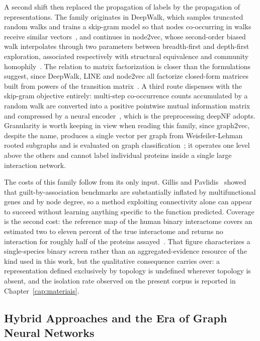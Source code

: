 \documentclass[Ingles]{ic-tese-v3}
\begin{document}
A second shift then replaced the propagation of labels by the propagation of representations. The
family originates in DeepWalk, which samples truncated random walks and trains a skip-gram model so
that nodes co-occurring in walks receive similar vectors~\cite{perozzi2014deepwalk}, and continues in
node2vec, whose second-order biased walk interpolates through two parameters between breadth-first
and depth-first exploration, associated respectively with structural equivalence and community
homophily~\cite{grover2016node2vec}. The relation to matrix factorization is closer than the
formulations suggest, since DeepWalk, LINE and node2vec all factorize closed-form matrices built from
powers of the transition matrix~\cite{qiu2018network}. A third route dispenses with the skip-gram
objective entirely: multi-step co-occurrence counts accumulated by a random walk are converted into a
positive pointwise mutual information matrix and compressed by a neural encoder~\cite{cao2016deep},
which is the preprocessing deepNF adopts. Granularity is worth keeping in view when reading this
family, since graph2vec, despite the name, produces a single vector per graph from
Weisfeiler-Lehman rooted subgraphs and is evaluated on graph
classification~\cite{narayanan2017graph2vec}; it operates one level above the others and cannot label
individual proteins inside a single large interaction network.

The costs of this family follow from its only input. Gillis and Pavlidis~\cite{gillis2011impact}
showed that guilt-by-association benchmarks are substantially inflated by multifunctional genes and
by node degree, so a method exploiting connectivity alone can appear to succeed without learning
anything specific to the function predicted. Coverage is the second cost: the reference map of the
human binary interactome covers an estimated two to eleven percent of the true interactome and
returns no interaction for roughly half of the proteins assayed~\cite{luck2020reference}. That figure
characterizes a single-species binary screen rather than an aggregated-evidence resource of the kind
used in this work, but the qualitative consequence carries over: a representation defined exclusively
by topology is undefined wherever topology is absent, and the isolation rate observed on the present
corpus is reported in Chapter~\ref{cap:materiais}.

\subsection{Hybrid Approaches and the Era of Graph Neural Networks}
\label{sec:rel_gnn}
\end{document}
